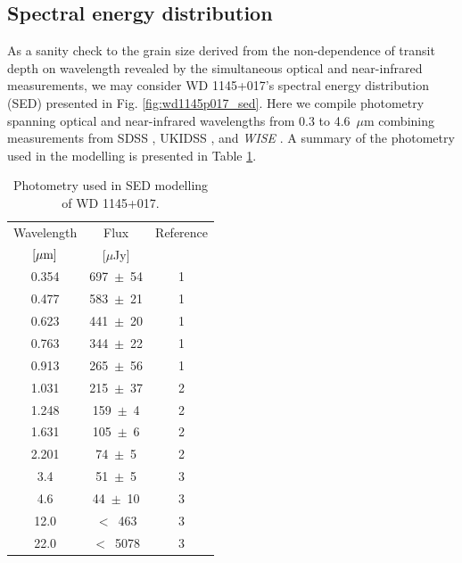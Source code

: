 \documentclass[iop,useAMES,usenatbig]{emulateapj}
\begin{document}
\subsection{Spectral energy distribution}

As a sanity check to the grain size derived from the non-dependence of transit depth on wavelength revealed by the simultaneous optical and near-infrared measurements, we may consider WD 1145+017's spectral energy distribution (SED) presented in Fig. \ref{fig:wd1145p017_sed}. Here we compile photometry spanning optical and near-infrared wavelengths from 0.3 to 4.6~$\mu$m combining measurements from SDSS \citep[$ugriz$;][]{2011ApJS..193...29A}, UKIDSS \citep[$YJHK$;][]{2007MNRAS.379.1599L}, and \textit{WISE} \citep[W1 and W2 -- W3 and W4 upper limits do not constrain the SED;][]{2010AJ....140.1868W}. A summary of the photometry used in the modelling is presented in Table \ref{tab:wd1145p017_phot}. 

\begin{table}[]
    \centering
    \caption{Photometry used in SED modelling of WD 1145+017. \label{tab:wd1145p017_phot}}
    \begin{tabular}{ccc}
        \hline\hline
        Wavelength & Flux  & Reference \\
        $[\mu \rm m]$ & [$\mu$Jy] & \\ 
        \hline
        \phantom{0}0.354 & 697~$\pm$~54 & 1\\
        \phantom{0}0.477 & 583~$\pm$~21 & 1\\
        \phantom{0}0.623 & 441~$\pm$~20 & 1\\
        \phantom{0}0.763 & 344~$\pm$~22 & 1\\
        \phantom{0}0.913 & 265~$\pm$~56 & 1\\
        \phantom{0}1.031 & 215~$\pm$~37 & 2\\
        \phantom{0}1.248 & 159~$\pm$~\phantom{0}4 & 2\\
        \phantom{0}1.631 & 105~$\pm$~\phantom{0}6 & 2\\
        \phantom{0}2.201 & \phantom{0}74~$\pm$~\phantom{0}5 & 2\\
        \phantom{0}3.4\phantom{00} & \phantom{0}51~$\pm$~\phantom{0}5 & 3\\
        \phantom{0}4.6\phantom{00} & \phantom{0}44~$\pm$~10 & 3\\
        12.0\phantom{00} & $<$~\phantom{0}463 & 3\\
        22.0\phantom{00} & $<$~5078 & 3\\
        \hline
    \end{tabular}
\end{table}
\end{document}
